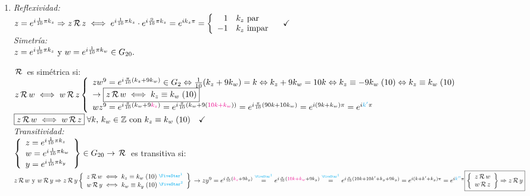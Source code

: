 \separadorCorto
\begin{enumerate}[label=\roman*)]
	\item
	      \textit{Reflexividad: }\\
	      $ z = e^{i\frac{1}{10}\pi k_z} \entonces
		      z \relacion z \sisolosi
		      e^{i\frac{1}{10}\pi k_z} \cdot e^{i\frac{9}{10}\pi k_z} =
		      e^{ik_z\pi } =
		      \llave{rl}{
			      1 & k_z \text{ par}\\
			      -1 & k_z \text{ impar}\\
		      } \Tilde
	      $\\

	      \textit{Simetría: }\\
	      $ z = e^{i\frac{1}{10}\pi k_z} \text{ y }  w = e^{i\frac{1}{10}\pi k_w} \en G_{20}.$

	      $\relacion$ es simétrica si:  $z \relacion w  \sisolosi w\relacion z\\
		      \llave{l}{
		      zw^9 = e^{i \frac{\pi}{10}(k_z + 9k_w)} \en G_2 \sii
		      \frac{1}{10}(k_z + 9k_w) = k \sii
		      k_z + 9k_w = 10k \sii
		      \congruencia{k_z}{-9k_w}{10} \sii
		      \congruencia{k_z}{k_w}{10} \\
		      \to \boxed{ z\relacion w  \sisolosi \congruencia{k_z}{k_w}{10}}\\

		      wz^9 = e^{i \frac{\pi}{10}(k_w + 9\magenta{k_z})} =
		      e^{i \frac{\pi}{10}(k_w + 9(\magenta{10k + k_w}))} =
				      e^{i \frac{\pi}{10}(90k + 10k_w)} =
				      e^{i (9k + k_w)\pi} =
				      e^{i\blue{k'}\pi}\\
			      }$\\
	      $\boxed{z \relacion w \sisolosi w \relacion z} \paratodo k,\,k_w \en \enteros \text{ con } \congruencia{k_z}{k_w}{10}\Tilde$\\

	      \textit{Transitividad: }\\
	      $ \llaves{l}{
			      z = e^{i\frac{1}{10}\pi k_z}\\
			      w = e^{i\frac{1}{10}\pi k_w}\\
			      y = e^{i\frac{1}{10}\pi k_y}
		      } \en G_{20}
		      \to
		      \relacion$ es transitiva si:  $z \relacion w  \text{ y } w\relacion y \entonces z \relacion y\\
		      \llaves{l}{
			      z \relacion w \sisolosi \congruencia{k_z}{k_w}{10} \llamada{1}\\
			      w \relacion y \sisolosi \congruencia{k_w}{k_y}{10} \llamada{2}
		      }\\
		      \to
		      zy^9 = e^{i \frac{\pi}{10}(\magenta{k_z} + 9k_y)} \stackrel{\llamada{1}}=
		      e^{i \frac{\pi}{10}(\magenta{10 k + k_w} + 9k_y)} \stackrel{\llamada{1}}=
		      e^{i \frac{\pi}{10}(10 k + 10k' + k_y + 9k_y)} =
		      e^{i (k + k' + k_y) \pi}  =
		      e^{i \blue{k''} \pi}
		      \\
		      \boxed{
			      \llaves{l}{
				      z \relacion w\\
				      w \relacion z
			      } \entonces z\relacion y}$


\end{enumerate}
